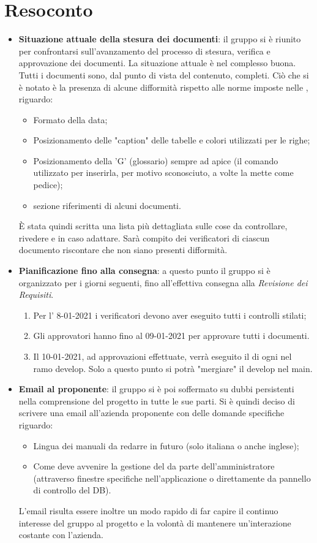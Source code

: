 \section{Resoconto}
\begin{itemize}
\item \textbf{Situazione attuale della stesura dei documenti}: il gruppo si è riunito per confrontarsi sull'avanzamento del processo di stesura, verifica e approvazione dei documenti. La situazione attuale è nel complesso buona. Tutti i documenti sono, dal punto di vista del contenuto, completi. Ciò che si è notato è la presenza di alcune difformità rispetto alle norme imposte nelle \NdPv{}, riguardo:
	\begin{itemize}
		\item Formato della data;
		\item Posizionamento delle "caption" delle tabelle e colori utilizzati per le righe;
		\item Posizionamento della 'G' (glossario) sempre ad apice (il comando utilizzato per inserirla, per motivo sconosciuto, a volte la mette come pedice);
		\item sezione riferimenti di alcuni documenti.
	\end{itemize} 
È stata quindi scritta una lista più dettagliata sulle cose da controllare, rivedere e in caso adattare. Sarà compito dei verificatori di ciascun documento riscontare che non siano presenti difformità. 

\item \textbf{Pianificazione fino alla consegna}: a questo punto il gruppo si è organizzato per i giorni seguenti, fino all'effettiva consegna alla \textit{Revisione dei Requisiti}. 
	\begin{enumerate}
		\item Per l' 8-01-2021 i verificatori devono aver eseguito tutti i controlli stilati;
		\item Gli approvatori hanno fino al 09-01-2021 per approvare tutti i documenti.
		\item Il 10-01-2021, ad approvazioni effettuate, verrà eseguito il  di ogni  nel ramo develop. Solo a questo punto si potrà "mergiare" il develop nel main.
	\end{enumerate}
	
\item \textbf{Email al proponente}: il gruppo si è poi soffermato su dubbi persistenti nella comprensione del progetto in tutte le sue parti. Si è quindi deciso di scrivere una email all'azienda proponente con delle domande specifiche riguardo:
	\begin{itemize}
		\item Lingua dei manuali da redarre in futuro (solo italiana o anche inglese);
		\item Come deve avvenire la gestione del  da parte dell'amministratore (attraverso finestre specifiche nell'applicazione o direttamente da pannello di controllo del DB).
	\end{itemize}
L'email risulta essere inoltre un modo rapido di far capire il continuo interesse del gruppo al progetto e la volontà di mantenere un'interazione costante con l'azienda.
\end{itemize}
\newpage